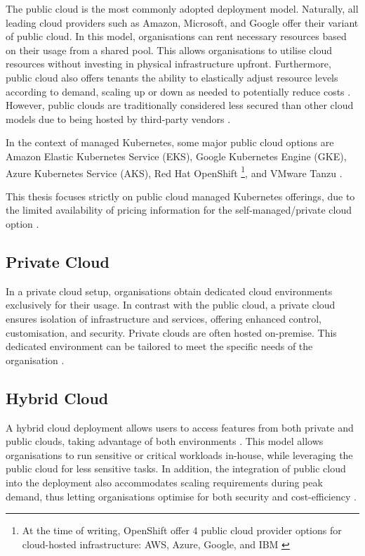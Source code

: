 The public cloud is the most commonly adopted deployment model. Naturally, all leading cloud providers such as Amazon, Microsoft, and Google offer their variant of public cloud. In this model, organisations can rent necessary resources based on their usage from a shared pool. This allows organisations to utilise cloud resources without investing in physical infrastructure upfront. Furthermore, public cloud also offers tenants the ability to elastically adjust resource levels according to demand, scaling up or down as needed to potentially reduce costs \cite{suleiman2012understanding}. However, public clouds are traditionally considered less secured than other cloud models due to being hosted by third-party vendors \cite{jadeja_cloud_2012}. 

In the context of managed Kubernetes, some major public cloud options are Amazon Elastic Kubernetes Service (EKS), Google Kubernetes Engine (GKE), Azure Kubernetes Service (AKS), Red Hat OpenShift \footnote{At the time of writing, OpenShift offer 4 public cloud provider options for cloud-hosted infrastructure: AWS, Azure, Google, and IBM \cite{noauthor_red_nodate}}, and VMware Tanzu \cite{noauthor_amazon_nodate, noauthor_gke_nodate, nickomang_azure_nodate, red_hat_inc_red_nodate, noauthor_vmware_nodate}.

This thesis focuses strictly on public cloud managed Kubernetes offerings, due to the limited availability of pricing information for the self-managed/private cloud option \cite{noauthor_red_nodate}.

\subsection{Private Cloud}

In a private cloud setup, organisations obtain dedicated cloud environments exclusively for their usage. In contrast with the public cloud, a private cloud ensures isolation of infrastructure and services, offering enhanced control, customisation, and security. Private clouds are often hosted on-premise. This dedicated environment can be tailored to meet the specific needs of the organisation \cite{jadeja_cloud_2012}.

\subsection{Hybrid Cloud}

A hybrid cloud deployment allows users to access features from both private and public clouds, taking advantage of both environments \cite{jadeja_cloud_2012, dash2016governance}. This model allows organisations to run sensitive or critical workloads in-house, while leveraging the public cloud for less sensitive tasks. In addition, the integration of public cloud into the deployment also accommodates scaling requirements during peak demand, thus letting organisations optimise for both security and cost-efficiency \cite{huang_achieving_2014}.





